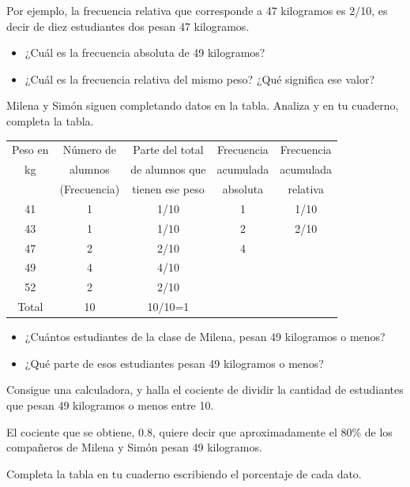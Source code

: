 \documentclass[10pt,twoside]{article}
\begin{document}
Por ejemplo, la frecuencia relativa que corresponde a 47 kilogramos es 2/10, es decir de diez estudiantes dos pesan 47 kilogramos.
\begin{itemize}
\item ¿Cuál es la frecuencia absoluta de 49 kilogramos?
\item ¿Cuál es la frecuencia relativa del mismo peso? ¿Qué significa ese valor?
\end{itemize}
Milena y Simón siguen completando datos en la tabla.
Analiza y en tu cuaderno, completa la tabla.
\begin{center}
\begin{tabular}{|c|c|c|c|c|}
\hline 
Peso en & Número de & Parte del total & Frecuencia & Frecuencia \\ 
kg & alumnos & de alumnos que & acumulada & acumulada \\ 
 & (Frecuencia) & tienen ese peso & absoluta & relativa \\ 
\hline 
41 & 1 & 1/10 & 1 & 1/10 \\ 
\hline 
43 & 1 & 1/10 & 2 & 2/10 \\ 
\hline 
47 & 2 & 2/10 & 4 &  \\ 
\hline 
49 & 4 & 4/10 &  &  \\ 
\hline 
52 & 2 & 2/10 & & \\ \hline \hline
Total & 10 & 10/10=1 & & \\ \hline
\end{tabular} 
\end{center}
\begin{itemize}
\item ¿Cuántos estudiantes de la clase de Milena, pesan 49 kilogramos o menos?
\item ¿Qué parte de esos estudiantes pesan 49 kilogramos o menos?
\end{itemize}
Consigue una calculadora, y halla el cociente de dividir la cantidad de estudiantes que pesan 49 kilogramos o menos entre 10.

El cociente que se obtiene, 0.8, quiere decir que aproximadamente el 80\% de los compañeros de Milena y Simón pesan 49 kilogramos.

Completa la tabla en tu cuaderno escribiendo el porcentaje de cada dato.\\

\end{document}
